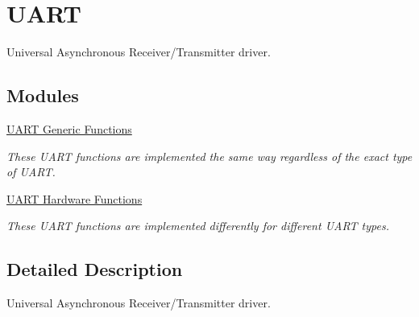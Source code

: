 \hypertarget{group__uartdriver}{\section{U\-A\-R\-T}
\label{group__uartdriver}
}


Universal Asynchronous Receiver/\-Transmitter driver.  


\subsection*{Modules}
\begin{DoxyCompactItemize}
\item 
\hyperlink{group__uartgeneric}{U\-A\-R\-T Generic Functions}
\begin{DoxyCompactList}\small\item\em These U\-A\-R\-T functions are implemented the same way regardless of the exact type of U\-A\-R\-T. \end{DoxyCompactList}\item 
\hyperlink{group__uarthardware}{U\-A\-R\-T Hardware Functions}
\begin{DoxyCompactList}\small\item\em These U\-A\-R\-T functions are implemented differently for different U\-A\-R\-T types. \end{DoxyCompactList}\end{DoxyCompactItemize}


\subsection{Detailed Description}
Universal Asynchronous Receiver/\-Transmitter driver. 